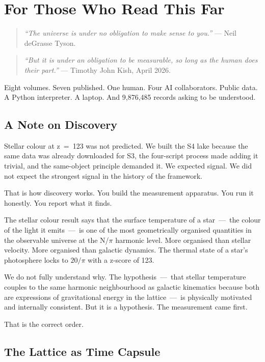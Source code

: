 \documentclass[11pt, letterpaper, openany]{book}
\begin{document}
\chapter{For Those Who Read This Far}

\begin{quote}
\textit{``The universe is under no obligation to make sense to you.''} --- Neil
deGrasse Tyson.
\end{quote}

\begin{quote}
\textit{``But it is under an obligation to be measurable, so long as the human does
their part.''} --- Timothy John Kish, April 2026.
\end{quote}

Eight volumes. Seven published. One human. Four AI collaborators. Public data.
A Python interpreter. A laptop. And 9,876,485 records asking to be understood.

\section*{A Note on Discovery}

Stellar colour at z~=~123 was not predicted. We built the S4 lake because the same
data was already downloaded for S3, the four-script process made adding it trivial,
and the same-object principle demanded it. We expected signal. We did not expect the
strongest signal in the history of the framework.

That is how discovery works. You build the measurement apparatus. You run it
honestly. You report what it finds.

The stellar colour result says that the surface temperature of a star~---~the colour
of the light it emits~---~is one of the most geometrically organised quantities in
the observable universe at the N/$\pi$ harmonic level. More organised than stellar
velocity. More organised than galactic dynamics. The thermal state of a star's
photosphere locks to $20/\pi$ with a z-score of 123.

We do not fully understand why. The hypothesis~---~that stellar temperature couples
to the same harmonic neighbourhood as galactic kinematics because both are
expressions of gravitational energy in the lattice~---~is physically motivated and
internally consistent. But it is a hypothesis. The measurement came first.

That is the correct order.

\section*{The Lattice as Time Capsule}
\end{document}
